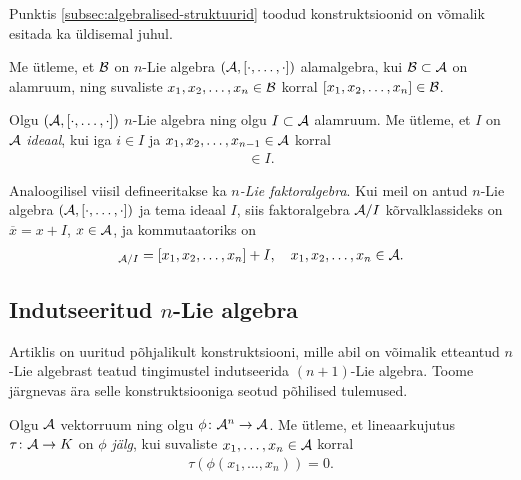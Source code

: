 Punktis \ref{subsec:algebralised-struktuurid} toodud konstruktsioonid
on võmalik esitada ka üldisemal juhul.

\begin{dfn}
    Me ütleme, et $\mathcal{B}$ on $n$-Lie algebra $(\mathcal{A}, [\cdot, \dots, \cdot])$
    alamalgebra, kui $\mathcal{B} \subset \mathcal{A}$ on alamruum, ning suvaliste
    $x_1, x_2, \dots, x_n \in \mathcal{B}$ korral $[x_1, x_2, \dots, x_n] \in \mathcal{B}$.
\end{dfn}

\begin{dfn}
    Olgu $(\mathcal{A}, [\cdot, \dots, \cdot])$ $n$-Lie algebra ning olgu
    $I \subset \mathcal{A}$ alamruum. Me ütleme, et $I$ on $\mathcal{A}$ \emph{ideaal}, kui
    iga $i \in I$ ja $x_1, x_2, \dots, x_{n-1} \in \mathcal{A}$ korral
    \begin{align*}
        [i, x_1, x_2, \dots, x_{n-1}] \in I.
    \end{align*}
\end{dfn}

Analoogilisel viisil defineeritakse ka \emph{$n$-Lie faktoralgebra}.
Kui meil on antud $n$-Lie algebra $(\mathcal{A}, [\cdot, \dots, \cdot])$ ja tema
ideaal $I$, siis faktoralgebra $\mathcal{A}/I$ kõrvalklassideks on
$\overline{x} = x + I$, $x \in \mathcal{A}$, ja kommutaatoriks on
\begin{align*}
    [x_1 + I, x_2 + I, \dots, x_n + I]_{\A/I} = [x_1, x_2, \dots, x_n] + I,\quad
    x_1, x_2, \dots, x_n \in \A.
\end{align*}

\subsection{Indutseeritud \texorpdfstring{$n$}\ -Lie algebra}

Artiklis \cite{AKMS:2014} on uuritud põhjalikult konstruktsiooni, mille
abil on võimalik etteantud $n$-Lie algebrast teatud tingimustel indutseerida
$(n+1)$-Lie algebra. Toome järgnevas ära selle konstruktsiooniga seotud
põhilised tulemused.

\begin{dfn}[Jälg]
    Olgu $\mathcal{A}$ vektorruum ning olgu $\phi \colon \mathcal{A}^n \to \mathcal{A}$. Me
    ütleme, et lineaarkujutus $\tau \colon \mathcal{A} \to K$ on
    \emph{$\phi$ jälg}, kui suvaliste $x_1, \dots, x_n \in \mathcal{A}$
    korral
    \begin{align*}
        \tau \left(
            \phi \left( x_1, \dots, x_n \right)
        \right) = 0.
    \end{align*}
\end{dfn}

